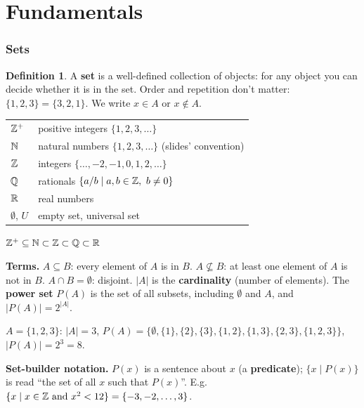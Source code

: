\documentclass{fkt-notes}
\newcommand{\src}[1]{\par\noindent{\small\itshape Source: #1}\par\smallskip}
\newcommand{\kolman}[1]{\setcounter{section}{\numexpr#1-1\relax}}
\theoremstyle{definition}
\newtheorem*{defn}{Definition}
\begin{document}
\newpage
\part{Fundamentals}

\kolman{1}
\section{Sets}\src{Kolman 1.1}
%

\begin{defn}
  A \textbf{set} is a well-defined collection of objects: for any object
  you can decide whether it is in the set. Order and repetition don't
  matter: $\{1,2,3\}=\{3,2,1\}$. We write $x\in A$ or $x\notin A$.
\end{defn}

\begin{center}
  \begin{tabular}{@{}ll@{}}
    \toprule
    $\mathbb{Z}^{+}$         & positive integers $\{1,2,3,\dots\}$                    \\
    $\mathbb{N}$             & natural numbers $\{1,2,3,\dots\}$ (slides' convention) \\
    $\mathbb{Z}$             & integers $\{\dots,-2,-1,0,1,2,\dots\}$                 \\
    $\mathbb{Q}$             & rationals $\{a/b \mid a,b\in\mathbb{Z},\ b\neq0\}$             \\
    $\mathbb{R}$             & real numbers                                           \\
    $\emptyset$, $U$ & empty set, universal set                               \\
    \bottomrule
  \end{tabular}
  \qquad
  $\mathbb{Z}^{+}\subseteq\mathbb{N}\subset\mathbb{Z}\subset\mathbb{Q}\subset\mathbb{R}$
\end{center}

\textbf{Terms.} $A\subseteq B$: every element of $A$ is in $B$.
$A\nsubseteq B$: at least one element of $A$ is not in $B$.
$A\cap B=\emptyset$: disjoint. $|A|$ is the \textbf{cardinality} (number
of elements). The \textbf{power set} $P(A)$ is the set of all subsets,
including $\emptyset$ and $A$, and $|P(A)|=2^{|A|}$.

\begin{example}
  $A=\{1,2,3\}$: $|A|=3$,
  $P(A)=\{\emptyset,\{1\},\{2\},\{3\},\{1,2\},\{1,3\},\{2,3\},\{1,2,3\}\}$,
  $|P(A)|=2^3=8$.
\end{example}
\textbf{Set-builder notation.} $P(x)$ is a sentence about $x$ (a
\textbf{predicate}); $\{x\mid P(x)\}$ is read ``the set of all $x$ such that
$P(x)$''. E.g.\ $\{x\mid x\in\mathbb{Z}\text{ and }x^2<12\}=\{-3,-2,\dots,3\}$.
%
\end{document}
